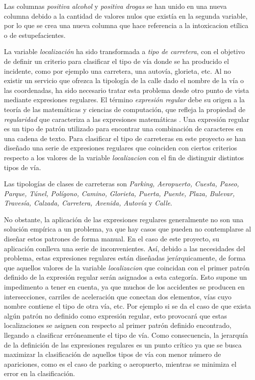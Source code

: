 \begin{enumerate}
                    Las columnas \textit{positiva alcohol} y \textit{positiva drogas} se han unido en una nueva columna debido a la cantidad de valores nulos que existía en la segunda variable, por lo que se crea una nueva columna que hace referencia a la intoxicacion etílica o de estupefacientes.
  

                    La variable \textit{localización} ha sido transformada a \textit{tipo de carretera}, con el objetivo de definir un criterio para clasificar el tipo de vía donde se ha producido el incidente, como por ejemplo una carretera, una autovía, glorieta, etc. Al no existir un servicio que ofrezca la tipología de la calle dado el nombre de la vía o las coordenadas, ha sido necesario tratar esta problema desde otro punto de vista mediante expresiones regulares. El término \textit{expresión regular} debe su origen a la teoría de las matemáticas y ciencias de computación, que refleja la propiedad de \textit{regularidad} que caracteriza a las expresiones matemáticas \cite{RegeXBook}. Una expresión regular es un tipo de patrón utilizado para encontrar una combinación de caracteres en una cadena de texto. Para clasificar el tipo de carreteras en este proyecto se han diseñado una serie de expresiones regulares que coinciden con ciertos criterios respecto a los valores de la variable \textit{localizacion} con el fin de distinguir distintos tipos de vía.


                    Las tipologías de clases de carreteras son \textit{Parking, Aeropuerto, Cuesta, Paseo, Parque, Túnel, Polígono, Camino, Glorieta, Puerta, Puente, Plaza, Bulevar, Travesía, Calzada, Carretera, Avenida, Autovía} y \textit{Calle}.


                    No obstante, la aplicación de las expresiones regulares generalmente no son una solución empírica a un problema, ya que hay casos que pueden no contemplarse al diseñar estos patrones de forma manual. En el caso de este proyecto, su aplicación conlleva una serie de inconvenientes. Así, debido a las necesidades del problema, estas expresiones regulares están diseñadas jerárquicamente, de forma que aquellos valores de la variable \textit{localizacion} que coincidan con el primer patrón definido de la expresión regular serán asignados a esta categoría. Esto supone un impedimento a tener en cuenta, ya que muchos de los accidentes se producen en intersecciones, carriles de aceleración que conectan dos elementos, vías cuyo nombre contiene el tipo de otra vía, etc. Por ejemplo si se da el caso de que exista algún patrón no definido como expresión regular, esto provocará que estas localizaciones se asignen con respecto al primer patrón definido encontrado, llegando a clasificar erróneamente el tipo de vía. Como consecuencia, la jerarquía de la definición de las expresiones regulares es un punto crítico ya que se busca maximizar la clasificación de aquellos tipos de vía con menor número de apariciones, como es el caso de parking o aeropuerto, mientras se minimiza el error en la clasificación.



\end{enumerate}
